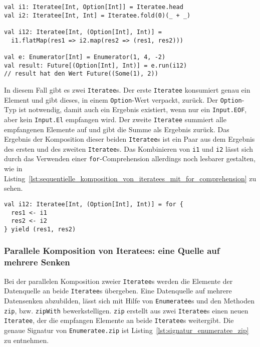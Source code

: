 \begin{lstlisting}[caption=Sequentielle Komposition von Iteratees, label=lst:sequentielle_komposition_von_iteratees]
val i1: Iteratee[Int, Option[Int]] = Iteratee.head
val i2: Iteratee[Int, Int] = Iteratee.fold(0)(_ + _)

val i12: Iteratee[Int, (Option[Int], Int)] =
  i1.flatMap(res1 => i2.map(res2 => (res1, res2)))

val e: Enumerator[Int] = Enumerator(1, 4, -2)
val result: Future[(Option[Int], Int)] = e.run(i12)
// result hat den Wert Future((Some(1), 2))
\end{lstlisting}

In diesem Fall gibt es zwei \lstinline|Iteratee|s.
Der erste \lstinline|Iteratee| konsumiert genau ein Element und gibt dieses, in einem \lstinline|Option|-Wert verpackt, zurück.
Der \lstinline|Option|-Typ ist notwendig, damit auch ein Ergebnis existiert, wenn nur ein \lstinline|Input.EOF|, aber kein \lstinline|Input.El| empfangen wird.
Der zweite \lstinline|Iteratee| summiert alle empfangenen Elemente auf und gibt die Summe als Ergebnis zurück.
Das Ergebnis der Komposition dieser beiden \lstinline|Iteratee|s ist ein Paar aus dem Ergebnis des ersten und des zweiten \lstinline|Iteratee|s.
Das Kombinieren von \lstinline|i1| und \lstinline|i2| lässt sich durch das Verwenden einer \lstinline|for|-Comprehension allerdings noch lesbarer gestalten, wie in Listing~\ref{lst:sequentielle_komposition_von_iteratees_mit_for_comprehension} zu sehen.

\begin{lstlisting}[caption=Sequentielle Komposition von Iteratees mit for-Comprehension, label=lst:sequentielle_komposition_von_iteratees_mit_for_comprehension]
val i12: Iteratee[Int, (Option[Int], Int)] = for {
  res1 <- i1
  res2 <- i2
} yield (res1, res2)
\end{lstlisting}


\subsubsection{Parallele Komposition von Iteratees: eine Quelle auf mehrere Senken} %
\label{ssub:anwendung_parallele_komposition_von_iteratees_eine_quelle}

Bei der parallelen Komposition zweier \lstinline|Iteratee|s werden die Elemente der Datenquelle an beide \lstinline|Iteratee|s übergeben.
Eine Datenquelle auf mehrere Datensenken abzubilden, lässt sich mit Hilfe von \lstinline|Enumeratee|s und den Methoden \lstinline|zip|, bzw. \lstinline|zipWith| bewerkstelligen.
\lstinline|zip| erstellt aus zwei \lstinline|Iteratee|s einen neuen \lstinline|Iteratee|, der die empfangen Elemente an beide \lstinline|Iteratee|s weitergibt.
Die genaue Signatur von \lstinline|Enumeratee.zip| ist Listing~\ref{lst:signatur_enumeratee_zip} zu entnehmen.

